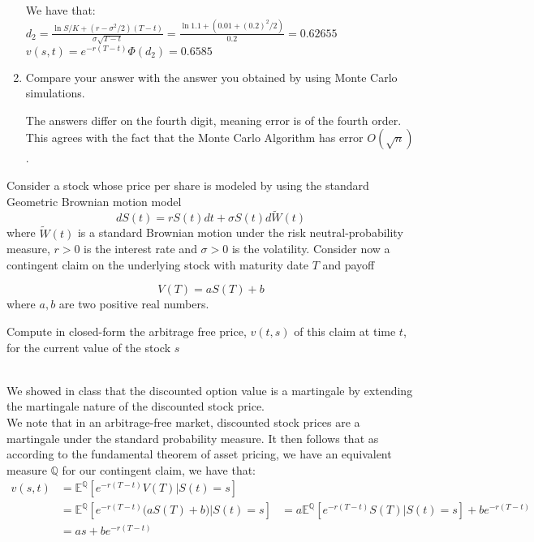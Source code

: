 \documentclass[12pt,twoside, letter]{exam}
\theoremstyle{definition}
\newcommand{\ee}{\mathbb{E}}
\begin{document}
\begin{enumerate}
        \begin{solution}
          We have that:\\
          $d_2 = \frac{\ln{S/K} + (r - \sigma^2/2)(T-t)}{\sigma\sqrt{T-t}} = \frac{\ln{1.1} + (0.01 + (0.2)^2/2)}{0.2} = 0.62655$ \\
          $v(s,t) = e^{-r(T-t)}\Phi(d_2) = 0.6585$
        \end{solution}
    \item Compare your answer with the answer you obtained by using Monte Carlo simulations.
      \begin{solution}
        The answers differ on the fourth digit, meaning error is of the fourth order. This agrees with the fact that the Monte Carlo Algorithm has error
        $O(\sqrt{n})$.
      \end{solution}
  \end{enumerate}

    \par{Consider a stock whose price per share is modeled by using the standard Geometric Brownian motion model}
  \begin{equation*}
    dS(t) = rS(t)dt + \sigma S(t)d\tilde{W}(t)
  \end{equation*}
  where $\tilde{W}(t)$ is a standard Brownian motion under the risk neutral-probability measure, $r > 0$ is the interest rate
  and $\sigma > 0$ is the volatility. Consider now a contingent claim on the underlying stock with maturity date $T$ and payoff

  \begin{equation*}
    V(T) = aS(T) + b
  \end{equation*}
  where $a,b$ are two positive real numbers.

  \par{Compute in closed-form the arbitrage free price, $v(t,s)$ of this claim at time $t$, for the current value of the stock $s$}

  \begin{solution}\\
    We showed in class that the discounted option value is a martingale by extending the martingale nature of the discounted stock price. \\
    We note that in an arbitrage-free market, discounted stock prices are a martingale under the standard probability measure. It then follows
    that as according to the fundamental theorem of asset pricing, we have an equivalent measure $\mathbb{Q}$ for our contingent claim, we have that:
    \begin{align*}
      v(s,t) &= \ee^{\mathbb{Q}}[e^{-r(T-t)}V(T) | S(t) = s] \\
      &= \ee^{\mathbb{Q}}[e^{-r(T-t)}\bigg(aS(T) + b \bigg) | S(t) = s]
      &= a \ee^{\mathbb{Q}}[e^{-r(T-t)}S(T)| S(t) = s] + be^{-r(T-t)} \\
      &= as + be^{-r(T-t)}
    \end{align*}
  \end{solution}
\end{document}
